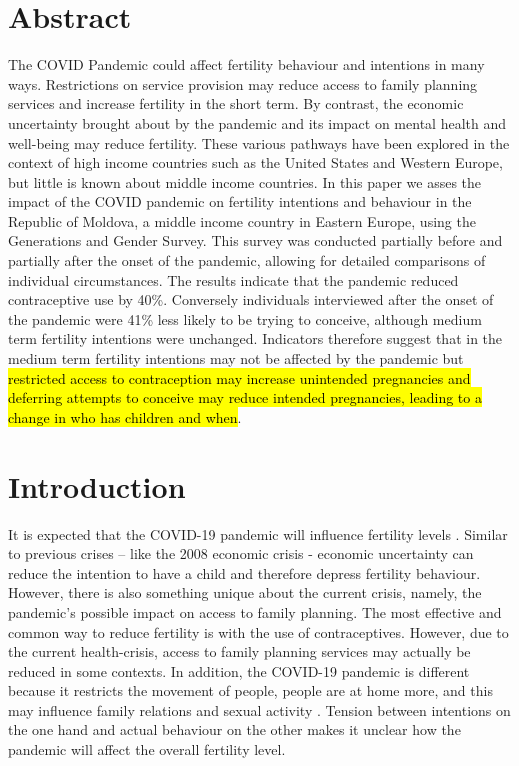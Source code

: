 \documentclass[10pt,letterpaper]{article}
\begin{document}
\section*{Abstract}
The COVID Pandemic could affect fertility behaviour and intentions in many ways. Restrictions on service provision may reduce access to family planning services and increase fertility in the short term. By contrast, the economic uncertainty brought about by the pandemic and its impact on mental health and well-being may reduce fertility. These various pathways have been explored in the context of high income countries such as the United States and Western Europe, but little is known about middle income countries. In this paper we asses the impact of the COVID pandemic on fertility intentions and behaviour in the Republic of Moldova, a middle income country in Eastern Europe, using the Generations and Gender Survey. This survey was conducted partially before and partially after the onset of the pandemic, allowing for detailed comparisons of individual circumstances. The results indicate that the pandemic reduced contraceptive use by 40\%. Conversely individuals interviewed after the onset of the pandemic were 41\% less likely to be trying to conceive, although medium term fertility intentions were unchanged. Indicators therefore suggest that in the medium term fertility intentions may not be affected by the pandemic but \hl{restricted access to contraception may increase unintended pregnancies and deferring attempts to conceive may reduce intended pregnancies, leading to a change in who has children and when}.

\linenumbers

\section*{Introduction}
It is expected that the COVID-19 pandemic will influence fertility levels \cite{lappegaard2020covid}. Similar to previous crises – like the 2008 economic crisis - economic uncertainty can reduce the intention to have a child and therefore depress fertility behaviour. However, there is also something unique about the current crisis, namely, the pandemic's possible impact on access to family planning. The most effective and common way to reduce fertility is with the use of contraceptives. However, due to the current health-crisis, access to family planning services may actually be reduced in some contexts. In addition, the COVID-19 pandemic is different because it restricts the movement of people, people are at home more, and this may influence family relations and sexual activity  \cite{settersten2020understanding}. Tension between intentions on the one hand and actual behaviour on the other makes it unclear how the pandemic will affect the overall fertility level.
\end{document}
